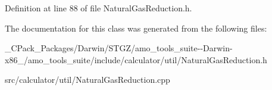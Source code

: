 Definition at line 88 of file Natural\+Gas\+Reduction.\+h.



The documentation for this class was generated from the following files\+:\begin{DoxyCompactItemize}
\item 
\+\_\+\+C\+Pack\+\_\+\+Packages/\+Darwin/\+S\+T\+G\+Z/amo\+\_\+tools\+\_\+suite-\/-\/\+Darwin-\/x86\+\_/amo\+\_\+tools\+\_\+suite/include/calculator/util/Natural\+Gas\+Reduction.\+h\item 
src/calculator/util/Natural\+Gas\+Reduction.\+cpp\end{DoxyCompactItemize}
